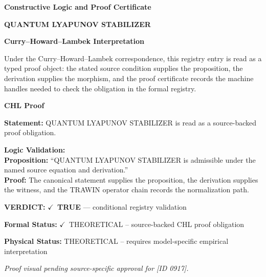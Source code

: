 \clearpage
\begingroup\tzpsupportsetup
\noindent\textbf{\fontsize{10.8pt}{12.8pt}\selectfont [ID 0917] Constructive Logic and Proof Certificate}\par
\noindent\textbf{\fontsize{10pt}{12pt}\selectfont QUANTUM LYAPUNOV STABILIZER}\par
\vspace{0.45em}
\begingroup
\footnotesize
\setlength{\parskip}{0.22em}
\setlength{\parindent}{0pt}
\noindent\textbf{Curry--Howard--Lambek Interpretation}\par
Under the Curry--Howard--Lambek correspondence, this registry entry is read as a typed proof
object: the stated source condition supplies the proposition, the derivation supplies the
morphism, and the proof certificate records the machine handles needed to check the obligation
in the formal registry.

\vspace{0.45em}
\noindent\textbf{CHL Proof}\par
\textbf{Statement:} QUANTUM LYAPUNOV STABILIZER is read as a source-backed proof obligation.

\textbf{Logic Validation:}\\
\textbf{Proposition:} ``QUANTUM LYAPUNOV STABILIZER is admissible under the named source equation and derivation.''\\
\textbf{Proof:} The canonical statement supplies the proposition, the derivation supplies the witness, and the TRAWIN operator chain records the normalization path.

\textbf{VERDICT:} \ensuremath{\checkmark}\ \textbf{TRUE} --- conditional registry validation

\textbf{Formal Status:} \ensuremath{\checkmark}\ THEORETICAL -- source-backed CHL proof obligation

\textbf{Physical Status:} THEORETICAL -- requires model-specific empirical interpretation
\par\vspace{0.45em}
\par
\vfill
\begingroup\footnotesize\itshape
Proof visual pending source-specific approval for [ID 0917].
\par\endgroup
\vfill
\endgroup
\endgroup
